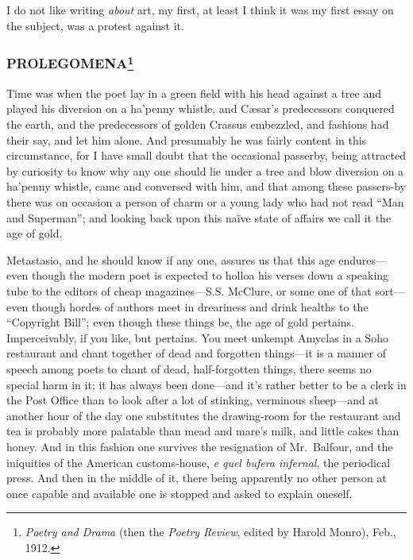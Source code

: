 I do not like writing \emph{about} art, my first, at least I think it
was my first essay on the subject, was a protest against it.

\subsubsection[PROLEGOMENA]{PROLEGOMENA\footnote{\emph{Poetry and Drama}
  (then the \emph{Poetry Review}, edited by Harold Monro), Feb., 1912.}}\label{prolegomena}

Time was when the poet lay in a green field with his head against a tree
and played his diversion on a ha'penny whistle, and Cæsar's predecessors
conquered the earth, and the predecessors of golden Crassus embezzled,
and fashions had their say, and let him alone. And presumably he was
fairly content in this circumstance, for I have small doubt that the
occasional passerby, being attracted by curiosity to know why any one
should lie under a tree and blow diversion on a ha'penny whistle, came
and conversed with him, and that among these passers-by there was on
occasion a person of charm or a young lady who had not read ``Man and
Superman''; and looking back upon this naïve state of affairs we call it
the age of gold.

Metastasio, and he should know if any one, assures us that this age
endures---even though the modern poet is expected to holloa his verses
down a speaking tube to the editors of cheap magazines---S.S. McClure,
or some one of that sort---even though hordes of authors meet in
dreariness and drink healths to the ``Copyright Bill''; even though
these things be, the age of gold pertains. Imperceivably, if you like,
but pertains. You meet unkempt Amyclas in a Soho restaurant and chant
together of dead and forgotten things---it is a manner of speech among
poets to chant of dead, half-forgotten things, there seems no special
harm in it; it has always been done---and it's rather better to be a
clerk in the Post Office than to look after a lot of stinking, verminous
sheep---and at another hour of the day one substitutes the drawing-room
for the restaurant and tea is probably more palatable than mead and
mare's milk, and little cakes than honey. And in this fashion one
survives the resignation of Mr.~Balfour, and the iniquities of the
American customs-house, \emph{e quel bufera infernal}, the periodical
press. And then in the middle of it, there being apparently no other
person at once capable and available one is stopped and asked to explain
oneself.

